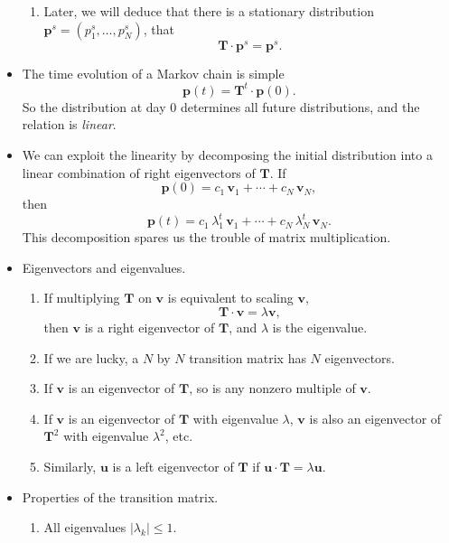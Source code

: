 \documentclass{report}
\begin{document}
\begin{itemize}
\begin{enumerate}
    \item
    Later, we will deduce that
    there is a stationary distribution
    $\mathbf p^s = (p^s_1, \dots, p^s_N)$,
    that
    $$
    \mathbf T \cdot \mathbf p^s
    =
    \mathbf p^s.
    $$
  \end{enumerate}

  \item
  The time evolution of a Markov chain is simple
  $$
  \mathbf p(t) = \mathbf T^t \cdot \mathbf p(0)
  .
  $$
  So the distribution at day $0$
  determines all future distributions,
  and the relation is \emph{linear}.

  \item
  We can exploit the linearity by
  decomposing the initial distribution
  into a linear combination of right eigenvectors
  of $\mathbf T$.
  If
  $$
  \mathbf p(0)
  =
  c_1 \, \mathbf v_1 + \cdots + c_N \, \mathbf v_N
  ,
  $$
  then
  $$
  \mathbf p(t)
  =
  c_1 \, \lambda_1^t \, \mathbf v_1
  + \cdots +
  c_N \, \lambda_N^t \, \mathbf v_N.
  $$
  This decomposition spares us the trouble
  of matrix multiplication.

  \item
  Eigenvectors and eigenvalues.
  \begin{enumerate}
    \item
    If multiplying $\mathbf T$ on $\mathbf v$
    is equivalent to scaling $\mathbf v$,
    $$
    \mathbf T \cdot \mathbf v
    =
    \lambda \mathbf v,
    $$
    then $\mathbf v$ is a right eigenvector of $\mathbf T$,
    and $\lambda$ is the eigenvalue.

    \item
    If we are lucky, a $N$ by $N$ transition matrix
    has $N$ eigenvectors.

    \item
    If $\mathbf v$ is an eigenvector of $\mathbf T$,
    so is any nonzero multiple of $\mathbf v$.

    \item
    If $\mathbf v$ is an eigenvector of $\mathbf T$
    with eigenvalue $\lambda$,
    $\mathbf v$ is also an eigenvector of $\mathbf T^2$
    with eigenvalue $\lambda^2$, etc.

    \item
    Similarly, $\mathbf u$ is a left eigenvector of $\mathbf T$
    if $\mathbf u \cdot \mathbf T = \lambda \mathbf u$.
  \end{enumerate}

  \item
  Properties of the transition matrix.
  \begin{enumerate}
    \item
    All eigenvalues $|\lambda_k| \le 1$.


\end{enumerate}
\end{itemize}
\end{document}

